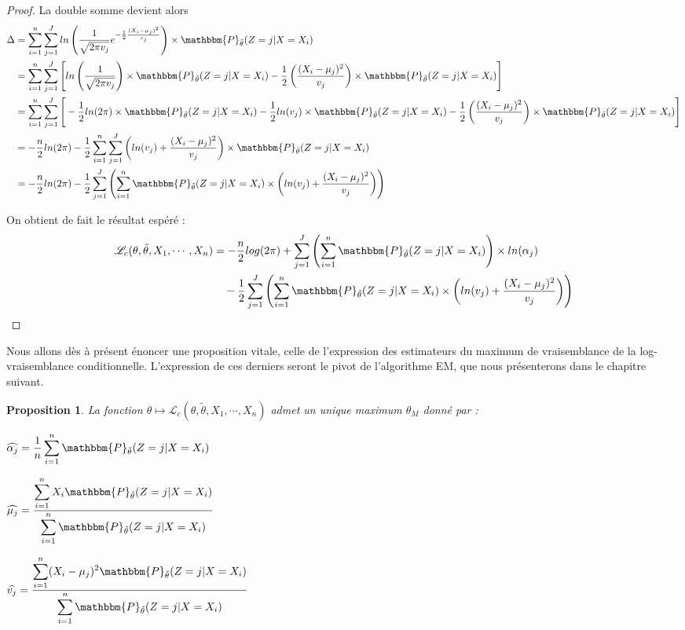 \documentclass[frenchb]{report}
\newcommand{\1}{\mathbbm{1}}
\newcommand{\prob}{\mathbbm{P}}
\newcommand{\lv}{\mathcal{L}}
\newcommand{\thetat}{\tilde{\theta}}
\newtheorem{prop}{Proposition}
\theoremstyle{definition}\newtheorem{defn}{Définition}
\theoremstyle{definition}\newtheorem{exm}{Exemple}
\theoremstyle{definition}\newtheorem{nota}{Notation}
\theoremstyle{definition}\newtheorem{rem}{Remarque}
\begin{document}
\begin{proof}
La double somme devient alors 
\begin{align*}
\Delta &= \sum_{i=1}^n \sum_{j = 1}^J ln\left(\frac{1}{\sqrt{2 \pi v_j}}e^{-\frac{1}{2}\frac{(X_i - \mu_j)^2}{v_j}}\right)\times\prob_{\thetat} (Z = j|X = X_i) \\
&=\sum_{i=1}^n \sum_{j = 1}^J \Bigg[ ln\left(\frac{1}{\sqrt{2 \pi v_j}}\right)\times\prob_{\thetat} (Z = j|X = X_i) -\frac{1}{2}\left(\frac{(X_i - \mu_j)^2}{v_j}\right)\times\prob_{\thetat} (Z = j|X = X_i)\Bigg]\\
&=\sum_{i=1}^n \sum_{j = 1}^J \Bigg[-\frac{1}{2} ln(2\pi)\times \prob_{\thetat} (Z = j|X = X_i)-\frac{1}{2}ln(v_j)\times \prob_{\thetat} (Z = j|X = X_i) -\frac{1}{2}\left(\frac{(X_i - \mu_j)^2}{v_j}\right)\times\prob_{\thetat} (Z = j|X = X_i) \Bigg]\\
&=-\frac{n}{2}ln(2\pi)  -\frac{1}{2} \sum_{i=1}^n \sum_{j = 1}^J \left(ln(v_j) + \frac{(X_i - \mu_j)^2}{v_j}\right)\times\prob_{\thetat} (Z = j|X = X_i) \\
&=-\frac{n}{2}ln(2\pi)  -\frac{1}{2} \sum_{j=1}^J \left( \sum_{i = 1}^n \prob_{\thetat} (Z = j|X = X_i)\times \left(ln(v_j) + \frac{(X_i - \mu_j)^2}{v_j}\right)\right) \\
\end{align*}

On obtient de fait le résultat espéré :
\begin{align*}
 \lv_{c}(\theta, \thetat, X_1, \cdots, X_n) &= -\frac{n}{2}log(2\pi)+\sum_{j=1}^J \left(\sum_{i = 1}^n  \prob_{\thetat}(Z=j|X=X_i)\right) \times ln(\alpha_j)\\
&~~~-\frac{1}{2}\sum_{j=1}^J\left(\sum_{i=1}^n \prob_{\thetat}(Z=j|X=X_i)\times\left(ln(v_j)+\frac{(X_i-\mu_j)^2}{v_j}\right)\right)
\end{align*}
\end{proof}

Nous allons dès à présent énoncer une proposition vitale, celle de l'expression des estimateurs du maximum de vraisemblance de la log-vraisemblance conditionnelle. L'expression de ces derniers seront le pivot de l'algorithme EM, que nous présenterons dans le chapitre suivant.

\begin{prop}La fonction $\theta \mapsto \lv_{c}(\theta,\thetat, X_1, \cdots, X_n)$ admet un unique maximum $\theta_M$ donné par : 
\begin{center}
$\widehat{\alpha_j} = \displaystyle\frac{1}{n}\sum_{i=1}^n \prob_{\thetat}(Z=j|X=X_i)$
\end{center}
\begin{center}

$\widehat{\mu_j}= \displaystyle\frac{\displaystyle\sum_{i=1}^n X_i\prob_{\thetat}(Z=j|X=X_i)}{\displaystyle\sum_{i=1}^n \prob_{\thetat}(Z=j|X=X_i)}$
\end{center}
\begin{center}

$\widehat{v_j} = \displaystyle\frac{\displaystyle\sum_{i=1}^n (X_i -\mu_j)^2 \prob_{\thetat}(Z=j|X=X_i)}{\displaystyle\sum_{i=1}^n\prob_{\thetat}(Z=j|X=X_i)}$
\end{center}
\end{prop}
\end{document}
